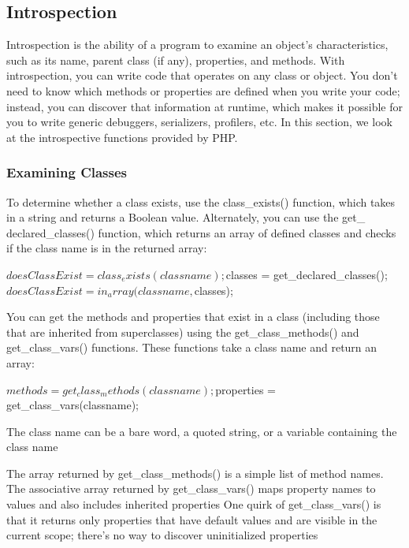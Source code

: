 \documentclass{report}
\begin{document}
\bigbreak \noindent 
\subsection{Introspection}
\bigbreak \noindent 
Introspection is the ability of a program to examine an object’s characteristics, such as
its name, parent class (if any), properties, and methods. With introspection, you can
write code that operates on any class or object. You don’t need to know which methods
or properties are defined when you write your code; instead, you can discover that
information at runtime, which makes it possible for you to write generic debuggers,
serializers, profilers, etc. In this section, we look at the introspective functions provided
by PHP.
\bigbreak \noindent 
\subsubsection{Examining Classes}
\bigbreak \noindent 
To determine whether a class exists, use the class\_exists() function, which takes in a string and returns a Boolean value. Alternately, you can use the get\_ declared\_classes() function, which returns an array of defined classes and checks if the class name is in the returned array:
\bigbreak \noindent 
\begin{phpcode}
    $doesClassExist = class_exists(classname);
    $classes = get_declared_classes();
    $doesClassExist = in_array(classname, $classes);
\end{phpcode}
\bigbreak \noindent 
You can get the methods and properties that exist in a class (including those that are inherited from superclasses) using the get\_class\_methods() and get\_class\_vars() functions. These functions take a class name and return an array:
\bigbreak \noindent 
\begin{phpcode}
    $methods = get_class_methods(classname);
    $properties = get_class_vars(classname);
\end{phpcode}
\bigbreak \noindent 
The class name can be a bare word, a quoted string, or a variable containing the class name
\bigbreak \noindent 
{}

\bigbreak \noindent 
The array returned by get\_class\_methods() is a simple list of method names. The
associative array returned by get\_class\_vars() maps property names to values and also
includes inherited properties
\bigbreak \noindent 
One quirk of get\_class\_vars() is that it returns only properties that have default values
and are visible in the current scope; there’s no way to discover uninitialized properties
\end{document}
